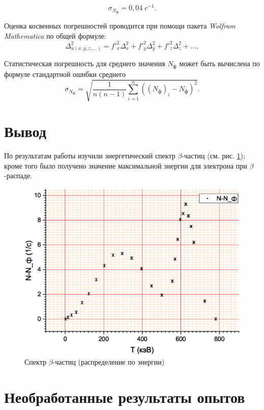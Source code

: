 \documentclass[a4paper]{article}
\newcommand{\btt}{$\beta $}
\begin{document}
		\begin{equation*}\label{key}
			\sigma_{N_ф} = 0,04 \;c^{-1}.
		\end{equation*}
		
	Оценка косвенных погрешностей проводится при помощи пакета \emph{Wolfram Mathematica} по общей формуле:
	\begin{equation}\label{eq:погрешности}
		\Delta_{u(x, y, z, \ldots)}^2 = f'^2_{x} \Delta_x^2 + f'^2_y \Delta_y^2 + f'^2_z \Delta_z^2 + \ldots,
	\end{equation}
	
	Статистическая погрешность для среднего значения $ N_ф $ может быть вычислена по формуле стандартной ошибки среднего
	\begin{equation}\label{eq:stat}
		\sigma_{N_ф} = \sqrt{\dfrac{1}{n (n-1)} \sum_{i=1}^{n}\left( (N_ф)_i - N_ф \right)^2 }.
	\end{equation}
	
	\newpage
	\section{Вывод}
	
	По результатам работы изучили энергетический спектр \btt-частиц (см. рис. \ref{fig:graph3}); кроме того было получено значение максимальной энергии для электрона при \btt-распаде.
	\begin{figure}
		\centering
		\includegraphics[width=0.9\linewidth]{Graph3}
		\caption{Спектр \btt-частиц (распределение по энергии)}
		\label{fig:graph3}
	\end{figure}
	
			\newpage
	\appendix
	\section{Необработанные результаты опытов}
	
\end{document}
